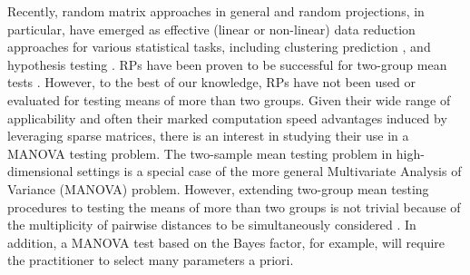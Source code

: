 \documentclass[pdflatex,sn-basic]{sn-jnl}%
\theoremstyle{thmstyleone}%
\theoremstyle{thmstyletwo}%
\theoremstyle{thmstylethree}%
\begin{document}
Recently, random matrix approaches in general and random projections, in particular, have emerged as effective (linear or non-linear) data reduction approaches for various statistical tasks, including clustering \citep{vrahatis2020ensemble,wan2020sharp} prediction \citep{Mukhopadhyay2020targeted}, and hypothesis testing \citep{lopes2011more,srivastava2014raptt,zoh2018powerful}. RPs have been proven to be successful for two-group mean tests \citep{lopes2011more,srivastava2014raptt,zoh2018powerful}. However, to the best of our knowledge, RPs have not been used or evaluated for testing means of more than two groups. Given their wide range of applicability and often their marked computation speed advantages induced by leveraging sparse matrices, there is an interest in studying their use in a MANOVA testing problem. The two-sample mean testing problem in high-dimensional settings is a special case of the more general Multivariate Analysis of Variance (MANOVA) problem. However, extending two-group mean testing procedures to testing the means of more than two groups is not trivial because of the multiplicity of pairwise distances to be simultaneously considered \citep{cai2014high}. In addition, a MANOVA test based on the Bayes factor, for example, will require the practitioner to select many parameters a priori. 
\end{document}
